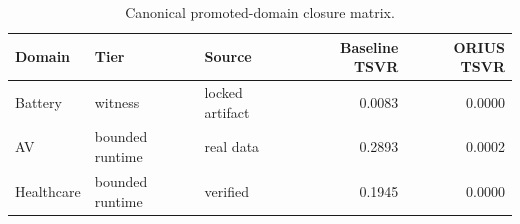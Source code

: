 \begin{table}[htbp]
\centering
\small
\caption{Canonical promoted-domain closure matrix.}
\label{tbl:orius-domain-closure-matrix}
\begin{tabular}{@{}lllrr@{}}
\toprule
Domain & Tier & Source & Baseline TSVR & ORIUS TSVR\\
\midrule
Battery & witness & locked artifact & 0.0083 & 0.0000\\
AV & bounded runtime & real data & 0.2893 & 0.0002\\
Healthcare & bounded runtime & verified & 0.1945 & 0.0000\\
\bottomrule
\end{tabular}
\end{table}
